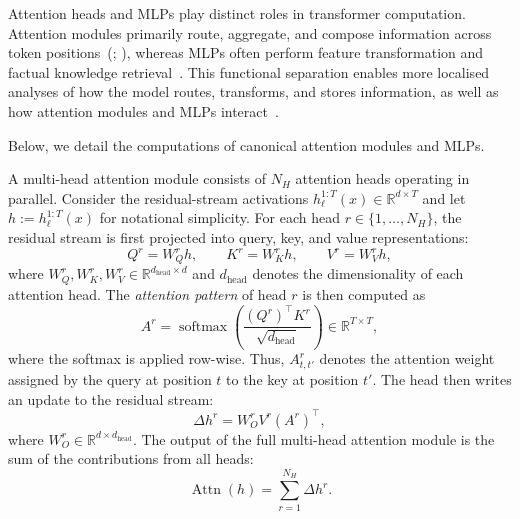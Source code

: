 Attention heads and MLPs play distinct roles in transformer computation. Attention modules primarily route, aggregate, and compose information across token positions~(; ), whereas MLPs often perform feature transformation and factual knowledge retrieval~. This functional separation enables more localised analyses of how the model routes, transforms, and stores information, as well as how attention modules and MLPs interact~.

Below, we detail the computations of canonical attention modules and MLPs.

\begin{definitionbox}

A multi-head attention module consists of $N_H$ attention heads operating in parallel. Consider the residual-stream activations $ h_\ell^{1:T}(x) \in \mathbb{R}^{d \times T}$ and let $h := h_\ell^{1:T}(x)$ for notational simplicity. For each head $r \in \{1,\ldots,N_H\}$, the residual stream is first projected into query, key, and value representations:
\[
Q^r = W_Q^r h,
\qquad
K^r = W_K^r h,
\qquad
V^r = W_V^r h,
\]
where $W_Q^r, W_K^r, W_V^r \in \mathbb{R}^{d_{\text{head}} \times d}$ and $d_{\text{head}}$ denotes the dimensionality of each attention head. The \emph{attention pattern} of head $r$ is then computed as
\[
A^r
=
\operatorname{softmax}\!\left(
\frac{(Q^r)^\top K^r}{\sqrt{d_{\text{head}}}}
\right)
\in
\mathbb{R}^{T \times T},
\]
where the softmax is applied row-wise. Thus, $A^r_{t,t'}$ denotes the attention weight assigned by the query at position $t$ to the key at position $t'$. The head then writes an update to the residual stream:
\[
\Delta h^r
=
W_O^r V^r (A^r)^\top,
\]
where $W_O^r \in \mathbb{R}^{d \times d_{\text{head}}}$. The output of the full multi-head attention module is the sum of the contributions from all heads:
\[
\operatorname{Attn}(h)
=
\sum_{r=1}^{N_H}
\Delta h^r.
\]

\end{definitionbox}


